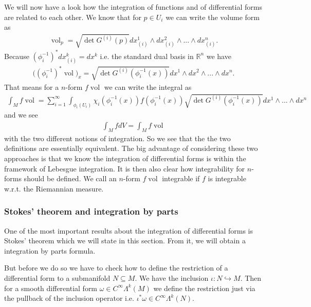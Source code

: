 \documentclass[12pt,a4paper]{article}
\numberwithin{equation}{subsection}
\numberwithin{lemma}{subsection}
\theoremstyle{definition}
\DeclareMathOperator{\vol}{vol}
\newcommand{\real}{\mathbb{R}}
\begin{document}
We will now have a look how the integration of functions and of 
differential forms are related to each other. 
We know that for $p \in U_i$ we can write the volume form as
\begin{align*}
    \vol_p = \sqrt{ \det G^{(i)}(p)} 
        dx_{(i)}^1 \wedge dx_{(i)}^2 \wedge ... \wedge dx_{(i)}^n.
\end{align*}
Because $(\phi_i^{-1})^* dx_{(i)}^k = dx^k$ i.e. the standard dual basis
in $\real^n$ we have
\begin{align*}
    \big( (\phi_i^{-1})^* \vol)_x =  
        \sqrt{ \det G^{(i)}(\phi_i^{-1}(x))} 
        dx^1 \wedge dx^2 \wedge ... \wedge dx^n.
\end{align*}
That means for a $n$-form $f \vol$ we can write the integral as
\begin{align*}
    \int_M f \vol = \sum_{i=1}^\infty \int_{\phi_i(U_i)} 
    \chi_i(\phi_i^{-1}(x)) f(\phi_i^{-1}(x))
        \sqrt{ \det G^{(i)}(\phi_i^{-1}(x))} dx^1 \wedge ... \wedge dx^n
\end{align*} 
and we see 
\begin{align*}
    \int_M f dV = \int_M f \vol
\end{align*}
with the two different notions of integration. So we see that the
the two definitions are essentially equivalent.
The big advantage of considering these two
approaches is that we know the integration of 
differential forms is within the framework of Lebesgue integration. 
It is then also 
clear how integrability for $n$-forms should be defined. We call an 
$n$-form $f \vol$ integrable if $f$ is integrable w.r.t. the Riemannian measure.

\subsubsection{Stokes' theorem and integration by parts} 

One of the most important results about the integration of differential forms
is Stokes' theorem which we will state in this section. From it, we will 
obtain a integration by parts formula.

But before we do so we have to check how to define the restriction of a
differential form to a submanifold $N \subseteq M$. 
We have the inclusion $\iota: N \hookrightarrow M$. Then for a 
smooth differential form $\omega \in C^\infty \Lambda^k (M)$ we define 
the restriction just via the pullback of the inclusion operator i.e. 
$\iota^* \omega \in C^\infty \Lambda^k(N)$. 
\end{document}
